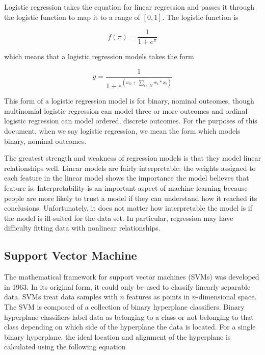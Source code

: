 Logistic regression takes the equation for linear regression and passes it through the logistic function to map it to a range of $[0, 1]$. The logistic function is 

\begin{equation}
f(\pi) = \frac{1}{1+e^{\pi}}
\end{equation}

\noindent which means that a logistic regression models takes the form

\begin{equation}
y = \frac{1}{1+e^{(w_0 + \sum_{i \in N} w_i*x_i)}}
\end{equation}

This form of a logistic regression model is for binary, nominal outcomes, though multinomial logistic regression can model three or more outcomes and ordinal logistic regression can model ordered, discrete outcomes. For the purposes of this document, when we say logistic regression, we mean the form which models binary, nominal outcomes. 

The greatest strength and weakness of regression models is that they model linear relationships well. Linear models are fairly interpretable: the weights assigned to each feature in the linear model shows the importance the model believes that feature is. Interpretability is an important aspect of machine learning because people are more likely to trust a model if they can understand how it reached its conclusions. Unfortunately, it does not matter how interpretable the model is if the model is ill-suited for the data set. In particular, regression may have difficulty fitting data with nonlinear relationships.

\subsection{Support Vector Machine}

The mathematical framework for support vector machines (SVMs) was developed in 1963. In its original form, it could only be used to classify linearly separable data. SVMs treat data samples with $n$ features as points in $n$-dimensional space. The SVM is composed of a collection of binary hyperplane classifiers. Binary hyperplane classifiers label data as belonging to a class or not belonging to that class depending on which side of the hyperplane the data is located. For a single binary hyperplane, the ideal location and alignment of the hyperplane is calculated using the following equation

